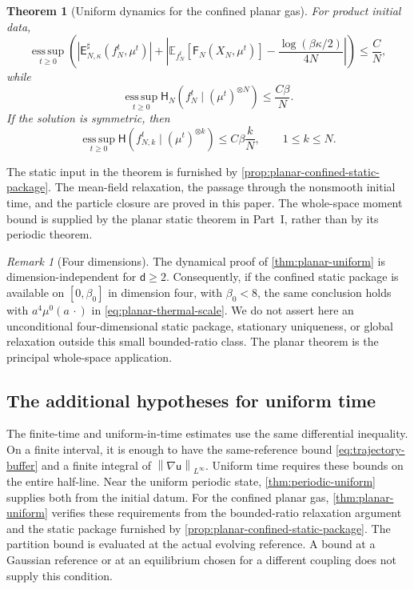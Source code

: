 \documentclass[11pt,reqno]{amsart}
\numberwithin{equation}{section}
\newtheorem{theorem}{Theorem}[section]
\theoremstyle{definition}
\theoremstyle{remark}
\newtheorem{remark}[remark]{Remark}
\newcommand{\E}{\mathbb E}
\renewcommand{\d}{\mathsf d}
\newcommand{\Hr}{\mathsf H}
\newcommand{\Fr}{\mathsf F}
\newcommand{\Er}{\mathsf E}
\renewcommand{\u}{\mathsf u}
\newcommand{\esssup}{\operatorname*{ess\,sup}}
\newcommand{\norm}[1]{\left\lVert#1\right\rVert}
\newcommand{\abs}[1]{\left\lvert#1\right\rvert}
\newcommand{\revision}[1]{{\ifdefined\MarkedRevision\color{red}\fi#1}}
\begin{document}
\begin{theorem}[Uniform dynamics for the confined planar gas]
For product initial data,
\begin{equation}\label{eq:planar-product-corrected-energies}
 \esssup_{t\geq0}
 \left(
  \abs{\Er_{N,\kappa}^{\sharp}(f_N^t,\mu^t)}+
  \abs{\E_{f_N^t}[\Fr_N(X_N,\mu^t)]-
        \frac{\log(\beta\kappa/2)}{4N}}
 \right)\leq\frac{C}{N},
\end{equation}
while
\begin{equation}\label{eq:planar-product-entropy}
 \esssup_{t\geq0}\Hr_N(f_N^t\mid(\mu^t)^{\otimes N})\leq\frac{C\beta}{N}.
\end{equation}
If the solution is symmetric, then
\begin{equation}\label{eq:planar-marginal-entropy}
 \esssup_{t\geq0}
 \Hr(f_{N,k}^t\mid(\mu^t)^{\otimes k})\leq C\beta\frac{k}{N},
 \qquad 1\leq k\leq N.
\end{equation}
\end{theorem}

The static input in the theorem is furnished by \cref{prop:planar-confined-static-package}. The mean-field relaxation, the passage through the nonsmooth initial time, and the particle closure are proved in this paper. The whole-space moment bound is supplied by the planar static theorem in Part~I, rather than by its periodic theorem.

\begin{remark}[Four dimensions]\label{rem:four-dimensional-confined}
The dynamical proof of \cref{thm:planar-uniform} is dimension-independent for $\d\geq2$. Consequently, if the confined static package is available on $[0,\beta_0]$ in dimension four, with $\beta_0<8$, the same conclusion holds with $a^4\mu^0(a\,\cdot)$ in \eqref{eq:planar-thermal-scale}. We do not assert here an unconditional four-dimensional static package, stationary uniqueness, or global relaxation outside this small bounded-ratio class. The planar theorem is the principal whole-space application.
\end{remark}
\endgroup

\subsection{The additional hypotheses for uniform time}
The finite-time and uniform-in-time estimates use the same differential inequality. On a finite interval, it is enough to have the same-reference bound \eqref{eq:trajectory-buffer} and a finite integral of $\norm{\nabla \u}_{L^\infty}$. Uniform time requires these bounds on the entire half-line. Near the uniform periodic state, \cref{thm:periodic-uniform} supplies both from the initial datum. For the confined planar gas, \cref{thm:planar-uniform} verifies these requirements from the bounded-ratio relaxation argument and the static package furnished by \cref{prop:planar-confined-static-package}. \revision{The partition bound is evaluated at the actual evolving reference.} A bound at a Gaussian reference or at an equilibrium chosen for a different coupling does not supply this condition.
\end{document}
